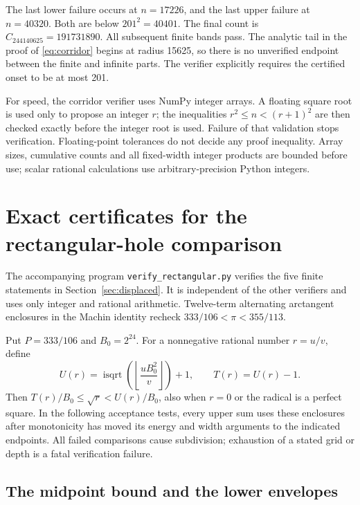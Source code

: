 \documentclass[11pt,reqno]{amsart}
\numberwithin{equation}{section}
\begin{document}
The last lower failure occurs at $n=17226$, and the last
upper failure at $n=40320$. Both are below $201^2=40401$.
The final count is $C_{244140625}=191731890$.
All subsequent finite bands pass. The analytic tail in
the proof of \eqref{eq:corridor} begins at radius 15625, so
there is no unverified endpoint between the finite and
infinite parts. The verifier explicitly requires the
certified onset to be at most 201.

For speed, the corridor verifier uses NumPy integer arrays.
A floating square root is used only to
propose an integer $r$; the inequalities
$r^2\le n<(r+1)^2$ are then checked exactly before the
integer root is used. Failure of that validation stops
verification. Floating-point tolerances do not decide
any proof inequality. Array sizes, cumulative counts
and all fixed-width integer products are bounded before
use; scalar rational calculations use arbitrary-precision
Python integers.

\section{Exact certificates for the rectangular-hole comparison}\label{app:displaced-certificate}

The accompanying program \texttt{verify\_rectangular.py}
verifies the five finite statements in Section~\ref{sec:displaced}.
It is independent of the other verifiers and uses only integer and
rational arithmetic. Twelve-term alternating arctangent enclosures
in the Machin identity recheck
$333/106<\pi<355/113$.

Put $P=333/106$ and $B_0=2^{24}$. For a nonnegative rational
number $r=u/v$, define
\begin{equation}\label{eq:rect-root-enclosure}
 U(r)=\operatorname{isqrt}\left(\left\lfloor
                  \frac{uB_0^2}{v}\right\rfloor\right)+1,
 \qquad T(r)=U(r)-1.
\end{equation}
Then $T(r)/B_0\le\sqrt r<U(r)/B_0$, also when $r=0$
or the radical is a perfect square. In the following acceptance
tests, every upper sum uses these enclosures after monotonicity
has moved its energy and width arguments to the indicated
endpoints. All failed comparisons cause subdivision; exhaustion
of a stated grid or depth is a fatal verification failure.

\subsection*{The midpoint bound and the lower envelopes}
\end{document}
